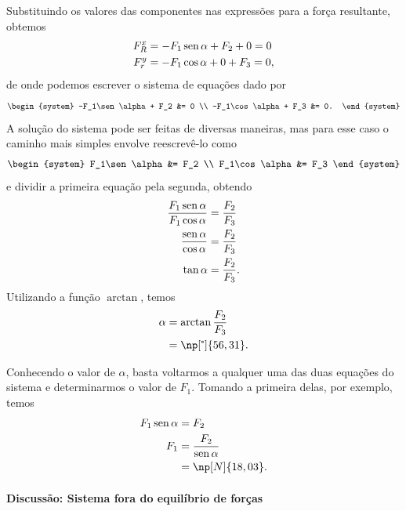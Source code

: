 Substituindo os valores das componentes nas expressões para a força resultante, obtemos
\begin{align}
    F_R^x &= -F_1\operatorname{sen}\alpha + F_2 + 0 = 0 \\
    F_r^y &= -F_1\cos\alpha + 0 + F_3 = 0,
\end{align} 
%
de onde podemos escrever o sistema de equações dado por
\begin{equation}
\begin{system}
    -F_1\sen\alpha + F_2 &= 0 \\
    -F_1\cos\alpha + F_3 &= 0.
\end{system}
\end{equation}
%
A solução do sistema pode ser feitas de diversas maneiras, mas para esse caso o caminho mais simples envolve reescrevê-lo como
\begin{equation}
\begin{system}
    F_1\sen\alpha &= F_2 \\
    F_1\cos\alpha &= F_3
\end{system}
\end{equation}
%
e dividir a primeira equação pela segunda, obtendo
\begin{align}
    \frac{F_1\operatorname{sen}\alpha}{F_1\cos\alpha} &= \frac{F_2}{F_3} \\
    \frac{\operatorname{sen}\alpha}{\cos\alpha} &= \frac{F_2}{F_3} \\
    \tan\alpha &= \frac{F_2}{F_3}.
\end{align}
%
Utilizando a função $\arctan$, temos
\begin{align}
    \alpha &= \arctan\frac{F_2}{F_3} \\
    &= \np[\tcdegree]{56,31}.
\end{align}

Conhecendo o valor de $\alpha$, basta voltarmos a qualquer uma das duas equações do sistema e determinarmos o valor de $F_1$. Tomando a primeira delas, por exemplo, temos
\begin{align}
    F_1 \sen\alpha &= F_2 \\
    F_1 &= \frac{F_2}{\sen\alpha} \\
    &= \np[N]{18,03}.
\end{align}

\paragraph{Discussão: Sistema fora do equilíbrio de forças}

